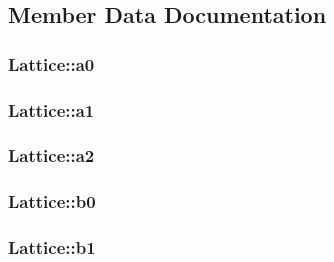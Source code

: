 \subsection{Member Data Documentation}
\hypertarget{class_lattice_a95d30f1d1ae0de04995d13af9107d0ad}{
\subsubsection[{a0}]{ Lattice\-::a0\hspace{0.3cm}{\ttfamily [static]}}}\label{class_lattice_a95d30f1d1ae0de04995d13af9107d0ad}
\hypertarget{class_lattice_aafaf7943af5721212a1dfa3536ed9f31}{
\subsubsection[{a1}]{ Lattice\-::a1\hspace{0.3cm}{\ttfamily [static]}}}\label{class_lattice_aafaf7943af5721212a1dfa3536ed9f31}
\hypertarget{class_lattice_a535fecf2a84d8bc97c91614d8ce4bc64}{
\subsubsection[{a2}]{ Lattice\-::a2\hspace{0.3cm}{\ttfamily [static]}}}\label{class_lattice_a535fecf2a84d8bc97c91614d8ce4bc64}
\hypertarget{class_lattice_a949c8b5b6bfa50ef7a8d4d7d11d5754e}{
\subsubsection[{b0}]{ Lattice\-::b0\hspace{0.3cm}{\ttfamily [static]}}}\label{class_lattice_a949c8b5b6bfa50ef7a8d4d7d11d5754e}
\hypertarget{class_lattice_a7a2e6b72776e2105c8f658d0728ea3de}{
\subsubsection[{b1}]{ Lattice\-::b1\hspace{0.3cm}{\ttfamily [static]}}}\label{class_lattice_a7a2e6b72776e2105c8f658d0728ea3de}
